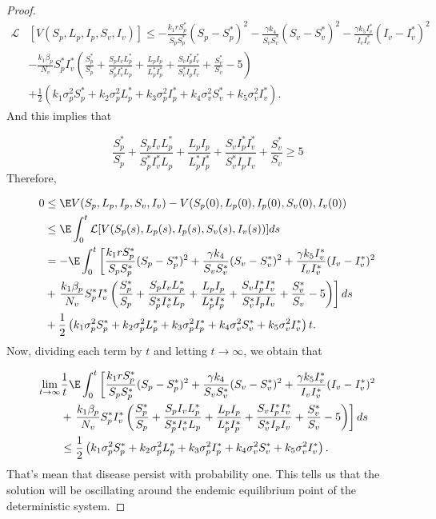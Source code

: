 \begin{proof}
	\begin{align*}
		\mathcal{L}&[V(S_p,L_p,I_p,S_v,I_v)]\leq 
				-\frac{k_1rS_p^*}{S_pS_p^*}(S_p-S_p^*)^2-\frac{\gamma k_4}{S_vS_v^*}(S_v-S_v^*)^2-\frac{\gamma k_5 I_v^*}{I_vI_v^*}(I_v-I_v^*)^2\\
			&-
				\frac{k_1\beta_p}{N_v}S_p^*I_v^*\left(\frac{S_p^*}{S_p}+\frac{S_pI_vL_p^*}{S_p^*I_v^*L_p}+\frac{L_pI_p}{L_p^*I_p^*}+\frac{S_vI_p^*I_v^*}{S_v^*I_pI_v}+\frac{S_v^*}{S_v}-5\right)\\
			&+
				\frac{1}{2}\left(k_1\sigma_p^2S_p^*+k_2\sigma_p^2 L_p^*+k_3\sigma_p^2I_p^*+k_4\sigma_v^2S_v^*+k_5\sigma_v^2I_v^*\right).
	\end{align*}
%
	And this implies that

	\begin{equation*}
			\frac{S_p^*}{S_p}+\frac{S_pI_vL_p^*}{S_p^*I_v^*L_p}+\frac{L_pI_p}{L_p^*I_p^*}+\frac{S_vI_p^*I_v^*}{S_v^*I_pI_v}+\frac{S_v^*}{S_v}\geq 5
	\end{equation*}
	Therefore,
	
	\begin{align*}
		0&\leq \E V(S_p,L_p,I_p,S_v,I_v)-V(S_p(0),L_p(0),I_p(0),S_v(0),I_v(0))\\
			&\leq 
				\E \int_{0}^{t}\mathcal{L}[V(S_p(s),L_p(s),I_p(s),S_v(s),I_v(s))]ds\\
			&=-	
				\E \int_{0}^{t} \left[\frac{k_1rS_p^*}{S_pS_p^*}(S_p-S_p^*)^2+\frac{\gamma k_4}{S_vS_v^*}(S_v-S_v^*)^2+\frac{\gamma k_5 I_v^*}{I_vI_v^*}(I_v-I_v^*)^2\right.\\
			&+
				\left.\frac{k_1\beta_p}{N_v}S_p^*I_v^*\left(\frac{S_p^*}{S_p}+\frac{S_pI_vL_p^*}{S_p^*I_v^*L_p}+\frac{L_pI_p}{L_p^*I_p^*}+\frac{S_vI_p^*I_v^*}{S_v^*I_pI_v}+\frac{S_v^*}{S_v}-5\right)\right]ds\\
			&+
				\frac{1}{2}\left(k_1\sigma_p^2S_p^*+k_2\sigma_p^2 L_p^*+k_3\sigma_p^2I_p^*+k_4\sigma_v^2S_v^*+k_5\sigma_v^2I_v^*\right)t.
	\end{align*}
%
	Now, dividing each term by $t$ and letting $t\rightarrow \infty$, we obtain that
	
	\begin{align*}	
		\lim\limits_{t\rightarrow \infty}&\frac{1}{t}\E \int_{0}^{t} \left[\frac{k_1rS_p^*}{S_pS_p^*}(S_p-S_p^*)^2+\frac{\gamma k_4}{S_vS_v^*}(S_v-S_v^*)^2+\frac{\gamma k_5 I_v^*}{I_vI_v^*}(I_v-I_v^*)^2\right.\\
		&+
		\left.\frac{k_1\beta_p}{N_v}S_p^*I_v^*\left(\frac{S_p^*}{S_p}+\frac{S_pI_vL_p^*}{S_p^*I_v^*L_p}+\frac{L_pI_p}{L_p^*I_p^*}+\frac{S_vI_p^*I_v^*}{S_v^*I_pI_v}+\frac{S_v^*}{S_v}-5\right)\right]ds\\
		&\leq
		\frac{1}{2}\left(k_1\sigma_p^2S_p^*+k_2\sigma_p^2 L_p^*+k_3\sigma_p^2I_p^*+k_4\sigma_v^2S_v^*+k_5\sigma_v^2I_v^*\right).
	\end{align*}
%	
	That's mean that disease persist with probability one. This tells us that the solution will be oscillating around the endemic equilibrium point of the deterministic system.
\end{proof}